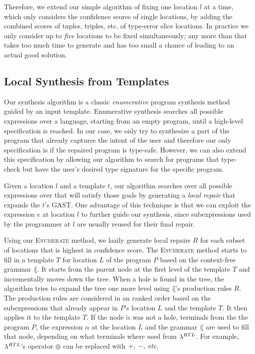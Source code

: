 Therefore, we extend our simple algorithm of fixing one location $l$ at a time,
which only considers the confidence scores of single locations, by adding the
combined scores of tuples, triples, etc. of type-error slice locations. In
practice we only consider up to \emph{five} locations to be fixed
simultaneously; any more than that takes too much time to generate and
has too small a chance of leading to an actual good solution.


\subsection{Local Synthesis from Templates}
\label{subsec:local-synthesis}

Our synthesis algorithm is a classic \emph{enumerative} program synthesis method
guided by an input template. Enumerative synthesis searches all possible
expressions over a language, starting from an empty program, until a high-level
specification is reached. In our case, we only try to synthesize a part of the
program that already captures the intent of the user and therefore our only
specification is if the repaired program is type-safe. However, we can also
extend this specification by allowing our algorithm to search for programs that
type-check but have the user's desired type signature for the specific program.

Given a location $l$ and a template $t$, our algorithm searches over all
possible expressions over \lang that will satisfy those goals by generating a
\emph{local repair} that expands the $t$'s GAST. One advantage of this technique
is that we can exploit the expression $e$ at location $l$ to further guide our
synthesis, since subexpressions used by the programmer at $l$ are usually reused
for their final repair.



Using our \textsc{Enumerate} method, we lazily generate local repairs $R$ for
each subset of locations that is highest in confidence score. The
\textsc{Enumerate} method starts to fill in a template $T$ for location $L$ of
the program $P$ based on the context-free grammar $\lang$. It starts from the
parent node at the first level of the template $T$ and incrementally moves
down the tree. When a hole is found in the tree, the algorithm tries to expand
the tree one more level using $\lang$'s production rules $R$. The production
rules are considered in an ranked order based on the subexpressions that already
appear in $P$'s location $L$ and the template $T$. It then applies it to the
template $T$. If the node $\tilde{\alpha}$ was not a hole, terminals from the
the program $P$, the expression $\alpha$ at the location $L$ and the grammar
$\lang$ are used to fill that node, depending on what terminals where used from
$\lambda^{RTL}$. For example, $\lambda^{RTL}$'s operator $\oplus$ can be replaced
with $+,\:-,\:\textit{etc.}$

